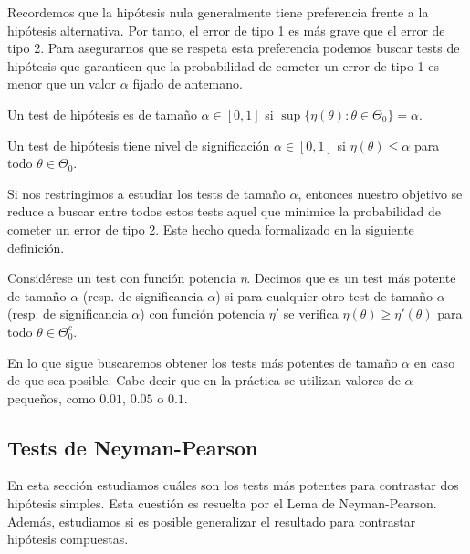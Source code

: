 \documentclass{article}
\begin{document}
Recordemos que la hipótesis nula generalmente tiene preferencia frente a la hipótesis alternativa. Por tanto, el error de tipo 1 es más grave que el error de tipo 2. Para asegurarnos que se respeta esta preferencia podemos buscar tests de hipótesis que garanticen que la probabilidad de cometer un error de tipo 1 es menor que un valor $\alpha$ fijado de antemano.

\begin{definition}
    Un test de hipótesis es de tamaño $\alpha \in [0,1]$ si $\sup\{\eta(\theta): \theta \in \Theta_0\} = \alpha$.
\end{definition}

\begin{definition}
    Un test de hipótesis tiene nivel de significación $\alpha \in [0,1]$ si $\eta(\theta) \le \alpha$ para todo $\theta \in \Theta_0$.
\end{definition}

Si nos restringimos a estudiar los tests de tamaño $\alpha$, entonces nuestro objetivo se reduce a buscar entre todos estos tests aquel que minimice la probabilidad de cometer un error de tipo 2. Este hecho queda formalizado en la siguiente definición.

\begin{definition}
    Considérese un test con función potencia $\eta$. Decimos que es un test más potente de tamaño $\alpha$ (resp. de significancia $\alpha$)  si para cualquier otro test de tamaño $\alpha$ (resp. de significancia $\alpha$) con función potencia $\eta'$ se verifica $\eta(\theta) \ge \eta'(\theta)$ para todo $\theta \in \Theta_0^c$.
\end{definition}

En lo que sigue buscaremos obtener los tests más potentes de tamaño $\alpha$ en caso de que sea posible. Cabe decir que en la práctica se utilizan valores de $\alpha$ pequeños, como $0.01$, $0.05$ o $0.1$.

\subsection{Tests de Neyman-Pearson}

En esta sección estudiamos cuáles son los tests más potentes para contrastar dos hipótesis simples. Esta cuestión es resuelta por el Lema de Neyman-Pearson. Además, estudiamos si es posible generalizar el resultado para contrastar hipótesis compuestas.
\end{document}
